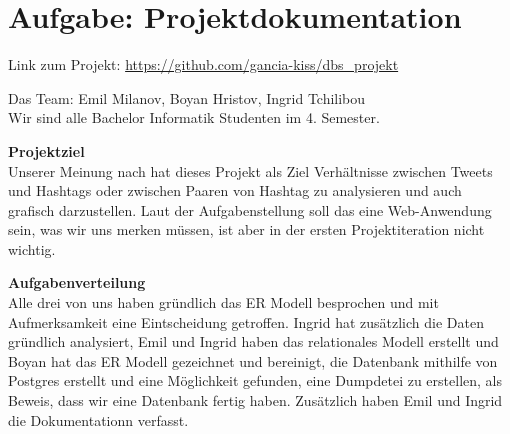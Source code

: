 \usepackage{graphicx}

\newcommand{\dozent}{Prof.  Dr.  Agnès Voisard, Nicolas Lehmann}					%
\newcommand{\tutor}{Hoffman Christian}						%
\newcommand{\tutoriumNo}{Tutorium 3}				%
\newcommand{\projectNo}{1}									%
\newcommand{\veranstaltung}{Datenbank Systeme}	%
\newcommand{\semester}{SoeSe 2017}						%
\newcommand{\studenten}{Ingrid Tchilibou, Emil Milanov, Boyan Hristov}			%





\section{Aufgabe: Projektdokumentation}
Link zum Projekt: \url{https://github.com/gancia-kiss/dbs_projekt}

Das Team: Emil Milanov, Boyan Hristov, Ingrid Tchilibou\\
Wir sind alle Bachelor Informatik Studenten im 4. Semester.

\textbf{Projektziel}\\
Unserer Meinung nach hat dieses Projekt als Ziel Verhältnisse zwischen Tweets und Hashtags oder zwischen Paaren von Hashtag zu 
analysieren und auch grafisch darzustellen. Laut der Aufgabenstellung soll das eine Web-Anwendung sein, was wir uns merken 
müssen, ist aber in der ersten Projektiteration nicht wichtig. 


\textbf{Aufgabenverteilung}\\
Alle drei von uns haben gründlich das ER Modell besprochen und mit Aufmerksamkeit eine Eintscheidung getroffen. Ingrid hat zusätzlich die Daten gründlich analysiert, Emil und Ingrid haben das relationales Modell erstellt und Boyan hat das ER Modell gezeichnet und bereinigt, die Datenbank mithilfe von Postgres erstellt und eine Möglichkeit gefunden, eine Dumpdetei zu erstellen, als Beweis, dass wir eine Datenbank fertig haben. Zusätzlich haben Emil und Ingrid die Dokumentationn verfasst.



